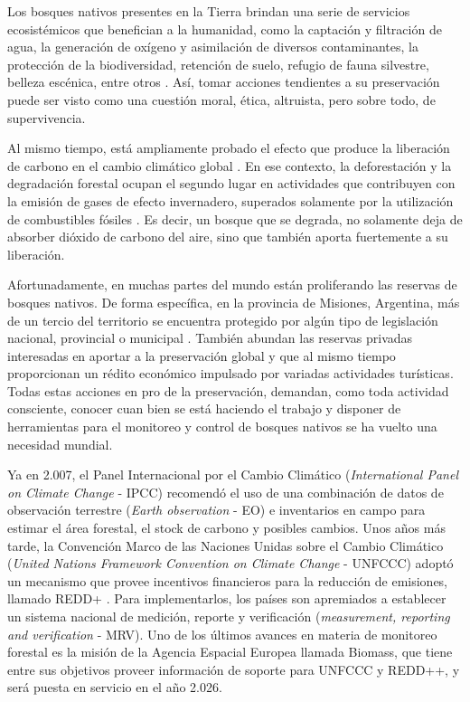 
Los bosques nativos presentes en la Tierra brindan una serie de servicios ecosistémicos que benefician a la humanidad, como la captación y filtración de agua, la generación de oxígeno y asimilación de diversos contaminantes, la protección de la biodiversidad, retención de suelo, refugio de fauna silvestre, belleza escénica, entre otros \cite{lin_optimization_2023}. Así, tomar acciones tendientes a su preservación puede ser visto como una cuestión moral, ética, altruista, pero sobre todo, de supervivencia.

Al mismo tiempo, está ampliamente probado el efecto que produce la liberación de carbono en el cambio climático global \cite{noauthor_pdf_nodate, kabir_climate_2023}. En ese contexto, la deforestación y la degradación forestal ocupan el segundo lugar en actividades que contribuyen con la emisión de gases de efecto invernadero, superados solamente por la utilización de combustibles fósiles \cite{chiriaco_deforestation_2024}. Es decir, un bosque que se degrada, no solamente deja de absorber dióxido de carbono del aire, sino que también aporta fuertemente a su liberación.

Afortunadamente, en muchas partes del mundo están proliferando las reservas de bosques nativos. De forma específica, en la provincia de Misiones, Argentina, más de un tercio del territorio se encuentra protegido por algún tipo de legislación nacional, provincial o municipal \cite{noauthor_revista_nodate}. También abundan las reservas privadas interesadas en aportar a la preservación global y que al mismo tiempo proporcionan un rédito económico impulsado por variadas actividades turísticas. Todas estas acciones en pro de la preservación, demandan, como toda actividad consciente, conocer cuan bien se está haciendo el trabajo y disponer de herramientas para el monitoreo y control de bosques nativos se ha vuelto una necesidad mundial.

Ya en 2.007, el Panel Internacional por el Cambio Climático (\textit{International Panel on Climate Change} - IPCC) recomendó el uso de una combinación de datos de observación terrestre (\textit{Earth observation} - EO) e inventarios en campo para estimar el área forestal, el stock de carbono y posibles cambios.  Unos años más tarde, la Convención Marco de las Naciones Unidas sobre el Cambio Climático (\textit{United Nations Framework Convention on Climate Change} - UNFCCC) adoptó un mecanismo que provee incentivos financieros para la reducción de emisiones, llamado REDD+ \cite{pistorius_red_2012}. Para implementarlos, los países son apremiados a establecer un sistema nacional de medición, reporte y verificación (\textit{measurement, reporting and verification} - MRV). Uno de los últimos avances en materia de monitoreo forestal es la misión de la Agencia Espacial Europea llamada Biomass, que tiene entre sus objetivos proveer información de soporte para UNFCCC y REDD++, y será puesta en servicio en el año 2.026.

